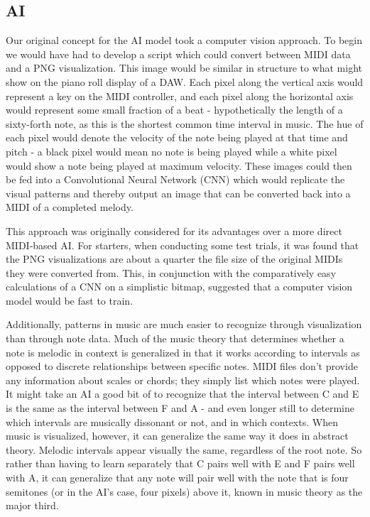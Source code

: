 \subsection{AI}

Our original concept for the AI model took a computer vision approach. To begin we would
have had to develop a script which could convert between MIDI data and a PNG
visualization. This image would be similar in structure to what might show on the piano
roll display of a DAW. Each pixel along the vertical axis would represent a key on the
MIDI controller, and each pixel along the horizontal axis would represent some small
fraction of a beat - hypothetically the length of a sixty-forth note, as this is the
shortest common time interval in music. The hue of each pixel would denote the velocity
of the note being played at that time and pitch - a black pixel would mean no note is
being played while a white pixel would show a note being played at maximum velocity.
These images could then be fed into a Convolutional Neural Network (CNN) which would
replicate the visual patterns and thereby output an image that can be converted back into
a MIDI of a completed melody.

This approach was originally considered for its advantages over a more direct MIDI-based
AI. For starters, when conducting some test trials, it was found that the PNG
visualizations are about a quarter the file size of the original MIDIs they were converted
from. This, in conjunction with the comparatively easy calculations of a CNN on a
simplistic bitmap, suggested that a computer vision model would be fast to train.

Additionally, patterns in music are much easier to recognize through visualization than
through note data. Much of the music theory that determines whether a note is melodic in
context is generalized in that it works according to intervals as opposed to discrete
relationships between specific notes. MIDI files don't provide any information about scales
or chords; they simply list which notes were played. It might take an AI a good bit of
to recognize that the interval between C and E is the same as the interval between F and A -
and even longer still to determine which intervals are musically dissonant or not, and in
which contexts. When music is visualized, however, it can generalize the same way it does in
abstract theory. Melodic intervals appear visually the same, regardless of the root note. So
rather than having to learn separately that C pairs well with E and F pairs well with A, it
can generalize that any note will pair well with the note that is four semitones (or in the
AI's case, four pixels) above it, known in music theory as the major third.

